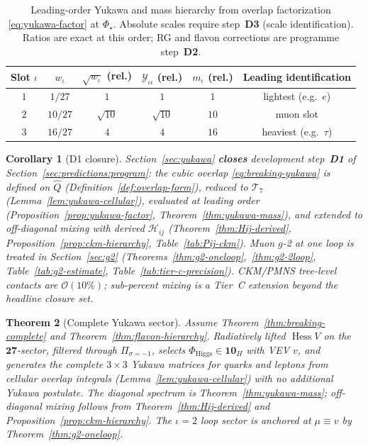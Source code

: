 \documentclass[11pt]{article}
\theoremstyle{plain}
\newtheorem{theorem}{Theorem}[section]
\newtheorem{corollary}[theorem]{Corollary}
\theoremstyle{definition}
\theoremstyle{remark}
\numberwithin{equation}{section}
\newcommand{\orderparam}{\Phi}
\newcommand{\Hess}{\operatorname{Hess}}
\begin{document}
\begin{table}[ht]
\centering
\small
\renewcommand{\arraystretch}{1.12}
\begin{tabular}{@{}cccccc@{}}
\toprule
\textbf{Slot $\iota$} & $w_\iota$ & $\sqrt{w_\iota}$ (rel.) &
$\mathcal{Y}_{\iota\iota}$ (rel.) & $m_\iota$ (rel.) &
\textbf{Leading identification} \\
\midrule
$1$ & $1/27$  & $1$        & $1$        & $1$  & lightest (e.g.\ $e$) \\
$2$ & $10/27$ & $\sqrt{10}$ & $\sqrt{10}$ & $10$ & muon slot \\
$3$ & $16/27$ & $4$        & $4$        & $16$ & heaviest (e.g.\ $\tau$) \\
\bottomrule
\end{tabular}
\caption{Leading-order Yukawa and mass hierarchy from overlap factorization
\eqref{eq:yukawa-factor} at $\orderparam_\star$. Absolute scales require
step~\textbf{D3} (scale identification). Ratios are exact at this order;
RG and flavon corrections are programme step~\textbf{D2}.}
\label{tab:yukawa-leading}
\end{table}

\begin{corollary}[D1 closure]\label{cor:yukawa-d1}
Section~\ref{sec:yukawa} \textbf{closes} development step~\textbf{D1} of
Section~\ref{sec:predictions:program}: the cubic overlap
\eqref{eq:breaking-yukawa} is defined on $\hat Q$
(Definition~\ref{def:overlap-form}), reduced to $\mathcal{T}_7$
(Lemma~\ref{lem:yukawa-cellular}), evaluated at leading order
(Proposition~\ref{prop:yukawa-factor}, Theorem~\ref{thm:yukawa-mass}), and
extended to off-diagonal mixing with derived $\mathcal{H}_{ij}$
(Theorem~\ref{thm:Hij-derived}, Proposition~\ref{prop:ckm-hierarchy},
Table~\ref{tab:Pij-ckm}). Muon $g$-2 at one loop is treated in
Section~\ref{sec:g2} (Theorems~\ref{thm:g2-oneloop},~\ref{thm:g2-2loop},
Table~\ref{tab:g2-estimate}, Table~\ref{tab:tier-c-precision}). CKM/PMNS
tree-level contacts are $\mathcal{O}(10\%)$; sub-percent mixing is a
Tier~C extension beyond the headline closure set.
\end{corollary}

\begin{theorem}[Complete Yukawa sector]\label{thm:yukawa-complete}
Assume Theorem~\ref{thm:breaking-complete} and
Theorem~\ref{thm:flavon-hierarchy}. Radiatively lifted $\Hess V$ on the
$\mathbf{27}$-sector, filtered through $\Pi_{\sigma=-1}$, selects
$\Phi_{\mathrm{Higgs}}\in\mathbf{10}_H$ with VEV $v$, and generates the
complete $3\times3$ Yukawa matrices for quarks and leptons from cellular
overlap integrals (Lemma~\ref{lem:yukawa-cellular}) with no additional Yukawa
postulate. The diagonal spectrum is Theorem~\ref{thm:yukawa-mass}; off-diagonal
mixing follows from Theorem~\ref{thm:Hij-derived} and
Proposition~\ref{prop:ckm-hierarchy}. The $\iota=2$ loop sector is anchored at
$\mu\equiv v$ by Theorem~\ref{thm:g2-oneloop}.
\end{theorem}
\end{document}
